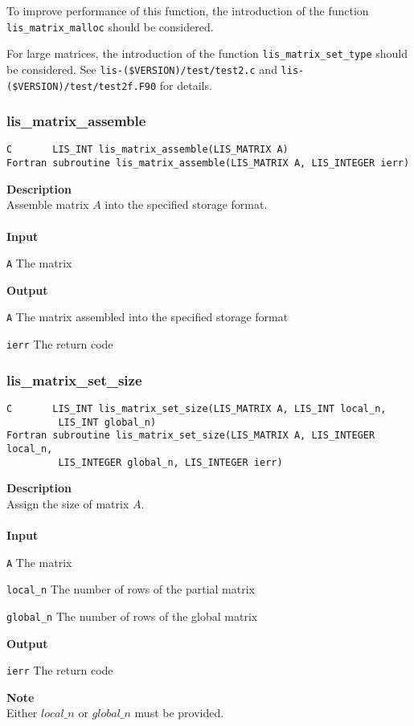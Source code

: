 \documentclass[a4paper]{article}
\newcommand{\namelistlabel}[1]{\mbox{#1}\hfill}
\newenvironment{namelist}[1]{%
\begin{list}{}
  {\let\makelabel\namelistlabel
  \settowidth{\labelwidth}{#1}
  \setlength{\leftmargin}{1.1\labelwidth}}
  }{%
\end{list}}
\begin{document}
To improve performance of this function, the introduction of the function \verb|lis_matrix_malloc| should be considered.

For large matrices, the introduction of the function \verb|lis_matrix_set_type|
should be considered. See {\tt lis-(\$VERSION)/test/test2.c} and
{\tt lis-(\$VERSION)/test/test2f.F90} for details.

\subsubsection{lis\_matrix\_assemble}
\begin{screen}
\verb|C       LIS_INT lis_matrix_assemble(LIS_MATRIX A)|\\
\verb|Fortran subroutine lis_matrix_assemble(LIS_MATRIX A, LIS_INTEGER ierr)|
\end{screen}
{\bf Description}\\
\indent
Assemble matrix $A$ into the specified storage format.
\\ \\
\noindent
{\bf Input}
\begin{namelist}{XXXXXXXXXXXXXXXXXXXX}
\item[\tt A] The matrix
\end{namelist}
{\bf Output}
\begin{namelist}{XXXXXXXXXXXXXXXXXXXX}
\item[\tt A] The matrix assembled into the specified storage format
\item[\tt ierr] The return code
\end{namelist}

\subsubsection{lis\_matrix\_set\_size}
\begin{screen}
\verb|C       LIS_INT lis_matrix_set_size(LIS_MATRIX A, LIS_INT local_n,|\\
\verb|         LIS_INT global_n)|\\
\verb|Fortran subroutine lis_matrix_set_size(LIS_MATRIX A, LIS_INTEGER local_n,|\\
\verb|         LIS_INTEGER global_n, LIS_INTEGER ierr)|
\end{screen}
{\bf Description}\\
\indent
Assign the size of matrix $A$.
\\ \\
\noindent
{\bf Input}
\begin{namelist}{XXXXXXXXXXXXXXXXXXXX}
\item[\tt A] The matrix
\item[\tt local\_n] The number of rows of the partial matrix
\item[\tt global\_n] The number of rows of the global matrix
\end{namelist}
{\bf Output}
\begin{namelist}{XXXXXXXXXXXXXXXXXXXX}
\item[\tt ierr] The return code
\end{namelist}
{\bf Note}\\
\indent
Either $local\_n$ or $global\_n$ must be provided. 
\end{document}
